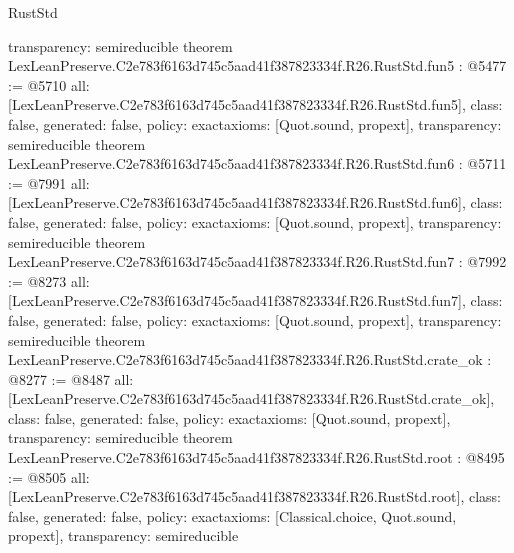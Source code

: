 \begin{lexlean}{RustStd}
\begin{coremodule}
{  transparency: semireducible
}
theorem LexLeanPreserve.C2e783f6163d745c5aad41f387823334f.R26.RustStd.fun5 : @5477 := @5710 {
  all: [LexLeanPreserve.C2e783f6163d745c5aad41f387823334f.R26.RustStd.fun5],
  class: false,
  generated: false,
  policy: exact{axioms: [Quot.sound, propext]},
  transparency: semireducible
}
theorem LexLeanPreserve.C2e783f6163d745c5aad41f387823334f.R26.RustStd.fun6 : @5711 := @7991 {
  all: [LexLeanPreserve.C2e783f6163d745c5aad41f387823334f.R26.RustStd.fun6],
  class: false,
  generated: false,
  policy: exact{axioms: [Quot.sound, propext]},
  transparency: semireducible
}
theorem LexLeanPreserve.C2e783f6163d745c5aad41f387823334f.R26.RustStd.fun7 : @7992 := @8273 {
  all: [LexLeanPreserve.C2e783f6163d745c5aad41f387823334f.R26.RustStd.fun7],
  class: false,
  generated: false,
  policy: exact{axioms: [Quot.sound, propext]},
  transparency: semireducible
}
theorem LexLeanPreserve.C2e783f6163d745c5aad41f387823334f.R26.RustStd.crate_ok : @8277 := @8487 {
  all: [LexLeanPreserve.C2e783f6163d745c5aad41f387823334f.R26.RustStd.crate_ok],
  class: false,
  generated: false,
  policy: exact{axioms: [Quot.sound, propext]},
  transparency: semireducible
}
theorem LexLeanPreserve.C2e783f6163d745c5aad41f387823334f.R26.RustStd.root : @8495 := @8505 {
  all: [LexLeanPreserve.C2e783f6163d745c5aad41f387823334f.R26.RustStd.root],
  class: false,
  generated: false,
  policy: exact{axioms: [Classical.choice, Quot.sound, propext]},
  transparency: semireducible
}


\end{coremodule}
\end{lexlean}
